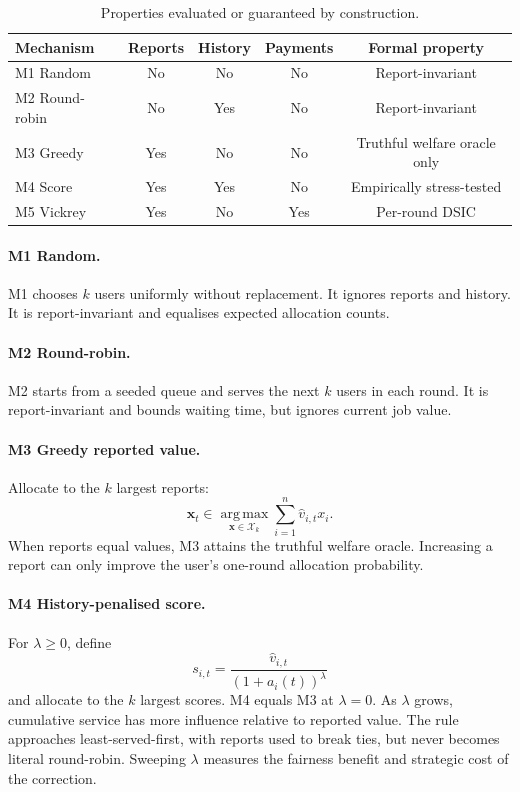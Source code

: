 \documentclass{article}
\begin{document}
\begin{table}[ht]
\caption{Properties evaluated or guaranteed by construction.}
\label{tab:mechanisms}
\centering
\small
\begin{tabular}{lcccc}
\toprule
Mechanism & Reports & History & Payments & Formal property \\
\midrule
M1 Random      & No  & No  & No  & Report-invariant \\
M2 Round-robin & No  & Yes & No  & Report-invariant \\
M3 Greedy      & Yes & No  & No  & Truthful welfare oracle only \\
M4 Score       & Yes & Yes & No  & Empirically stress-tested \\
M5 Vickrey     & Yes & No  & Yes & Per-round DSIC \\
\bottomrule
\end{tabular}
\end{table}

\paragraph{M1 Random.}
M1 chooses $k$ users uniformly without replacement. It ignores reports and
history. It is report-invariant and equalises expected allocation counts.

\paragraph{M2 Round-robin.}
M2 starts from a seeded queue and serves the next $k$ users in each round. It
is report-invariant and bounds waiting time, but ignores current job value.

\paragraph{M3 Greedy reported value.}
Allocate to the $k$ largest reports:
\[
  \mathbf x_t\in
  \operatorname*{arg\,max}_{\mathbf x\in\mathcal X_k}
  \sum_{i=1}^n\hat v_{i,t}x_i.
\]
When reports equal values, M3 attains the truthful welfare oracle. Increasing a
report can only improve the user's one-round allocation probability.

\paragraph{M4 History-penalised score.}
For $\lambda\ge0$, define
\[
  s_{i,t}=\frac{\hat v_{i,t}}{(1+a_i(t))^{\lambda}}
\]
and allocate to the $k$ largest scores. M4 equals M3 at $\lambda=0$. As
$\lambda$ grows, cumulative service has more influence relative to reported
value. The rule approaches least-served-first, with reports used to break ties,
but never becomes literal round-robin. Sweeping $\lambda$ measures the fairness
benefit and strategic cost of the correction.
\end{document}
